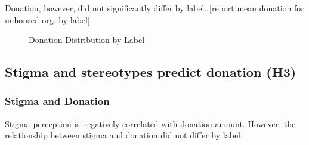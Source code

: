 \documentclass[
  man,
  floatsintext,
  longtable,
  nolmodern,
  notxfonts,
  notimes,
  colorlinks=true,linkcolor=blue,citecolor=blue,urlcolor=blue]{apa7}
\begin{document}
Donation, however, did not significantly differ by label. {[}report mean
donation for unhoused org. by label{]}

\begin{figure}

\caption{\label{fig-donate-all-by-label}Donation Distribution by Label}


\end{figure}%

\subsection{Stigma and stereotypes predict donation
(H3)}\label{stigma-and-stereotypes-predict-donation-h3}

\subsubsection{Stigma and Donation}\label{stigma-and-donation}

Stigma perception is negatively correlated with donation amount.
However, the relationship between stigma and donation did not differ by
label.
\end{document}
